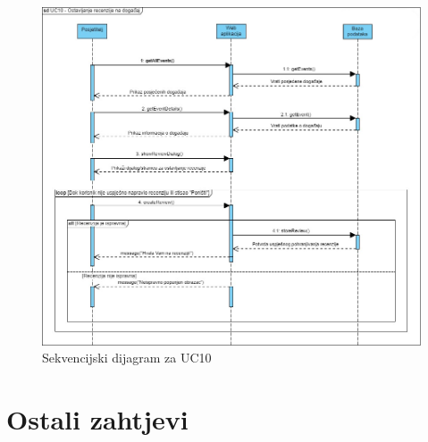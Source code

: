 				\begin{figure}[htbp]
					\centering
					\includegraphics[width=1\textwidth]{dijagrami/seq_diagram_review.jpg}
					\caption{Sekvencijski dijagram za UC10}
				\label{fig:my_image}
				\end{figure}

     \eject
	
		\section{Ostali zahtjevi}
			 
